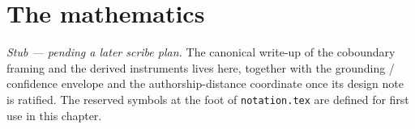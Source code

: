 \chapter{The mathematics}
\label{ch:math}

\emph{Stub — pending a later scribe plan.} The canonical write-up of the coboundary
framing and the derived instruments lives here, together with the grounding /
confidence envelope and the authorship-distance coordinate once its design note is
ratified. The reserved symbols at the foot of \texttt{notation.tex} are defined for
first use in this chapter.
